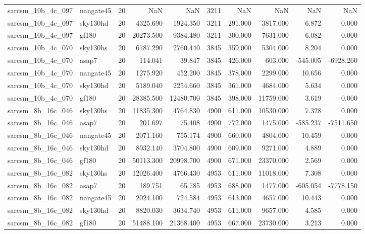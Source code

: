 \begin{longtable}{llrrrrrrrr}
sarcsm\_10b\_4c\_097 & nangate45 & 20 & NaN & NaN & 3211 & NaN & NaN & NaN & NaN \\
sarcsm\_10b\_4c\_097 & sky130hd & 20 & 4325.690 & 1924.350 & 3211 & 291.000 & 3817.000 & 6.872 & 0.000 \\
sarcsm\_10b\_4c\_097 & gf180 & 20 & 20273.500 & 9384.480 & 3211 & 300.000 & 7631.000 & 6.082 & 0.000 \\
sarcsm\_10b\_4c\_070 & sky130hs & 20 & 6787.290 & 2760.440 & 3845 & 359.000 & 5304.000 & 8.204 & 0.000 \\
sarcsm\_10b\_4c\_070 & asap7 & 20 & 114.041 & 39.847 & 3845 & 426.000 & 603.000 & -545.005 & -6928.260 \\
sarcsm\_10b\_4c\_070 & nangate45 & 20 & 1275.920 & 452.200 & 3845 & 378.000 & 2299.000 & 10.656 & 0.000 \\
sarcsm\_10b\_4c\_070 & sky130hd & 20 & 5189.040 & 2254.660 & 3845 & 361.000 & 4684.000 & 5.634 & 0.000 \\
sarcsm\_10b\_4c\_070 & gf180 & 20 & 28385.500 & 12480.700 & 3845 & 398.000 & 11759.000 & 3.619 & 0.000 \\
sarcsm\_8b\_16c\_046 & sky130hs & 20 & 11835.300 & 4764.830 & 4900 & 611.000 & 10530.000 & 7.328 & 0.000 \\
sarcsm\_8b\_16c\_046 & asap7 & 20 & 201.697 & 75.408 & 4900 & 772.000 & 1475.000 & -585.237 & -7511.650 \\
sarcsm\_8b\_16c\_046 & nangate45 & 20 & 2071.160 & 755.174 & 4900 & 660.000 & 4804.000 & 10.459 & 0.000 \\
sarcsm\_8b\_16c\_046 & sky130hd & 20 & 8932.140 & 3704.800 & 4900 & 609.000 & 9271.000 & 4.889 & 0.000 \\
sarcsm\_8b\_16c\_046 & gf180 & 20 & 50113.300 & 20998.700 & 4900 & 671.000 & 23370.000 & 2.569 & 0.000 \\
sarcsm\_8b\_16c\_082 & sky130hs & 20 & 12026.400 & 4766.430 & 4953 & 611.000 & 11018.000 & 7.308 & 0.000 \\
sarcsm\_8b\_16c\_082 & asap7 & 20 & 189.751 & 65.785 & 4953 & 688.000 & 1477.000 & -605.054 & -7778.150 \\
sarcsm\_8b\_16c\_082 & nangate45 & 20 & 2024.100 & 724.584 & 4953 & 613.000 & 4657.000 & 10.443 & 0.000 \\
sarcsm\_8b\_16c\_082 & sky130hd & 20 & 8820.030 & 3634.740 & 4953 & 611.000 & 9657.000 & 4.585 & 0.000 \\
sarcsm\_8b\_16c\_082 & gf180 & 20 & 51488.100 & 21368.400 & 4953 & 667.000 & 23730.000 & 3.213 & 0.000 \\

\end{longtable}
